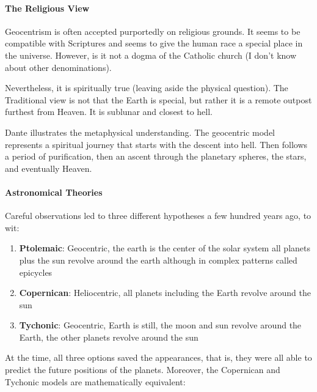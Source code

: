 \paragraph{The Religious View}


Geocentrism is often accepted purportedly on religious grounds. It seems to be compatible with Scriptures and seems to give the human race a special place in the universe. However, is it not a dogma of the Catholic church (I don't know about other denominations).

Nevertheless, it is spiritually true (leaving aside the physical question). The Traditional view is not that the Earth is special, but rather it is a remote outpost furthest from Heaven. It is sublunar and closest to hell.

Dante illustrates the metaphysical understanding. The geocentric model represents a spiritual journey that starts with the descent into hell. Then follows a period of purification, then an ascent through the planetary spheres, the stars, and eventually Heaven.

\paragraph{Astronomical Theories}





Careful observations led to three different hypotheses a few hundred years ago, to wit:

\begin{enumerate}


\item \textbf{Ptolemaic}: Geocentric, the earth is the center of the solar system all planets plus the sun revolve around the earth although in complex patterns called epicycles

\item \textbf{Copernican}: Heliocentric, all planets including the Earth revolve around the sun

\item \textbf{Tychonic}: Geocentric, Earth is still, the moon and sun revolve around the Earth, the other planets revolve around the sun
\end{enumerate}


At the time, all three options saved the appearances, that is, they were all able to predict the future positions of the planets. Moreover, the Copernican and Tychonic models are mathematically equivalent:

